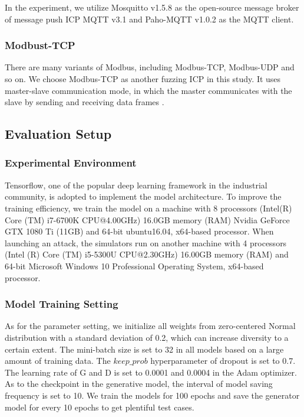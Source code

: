 In the experiment, we utilize Mosquitto v1.5.8 \cite{light2017mosquitto} as the open-source message broker of message push ICP MQTT v3.1 and  Paho-MQTT v1.0.2 \cite{light2017mosquitto} as the MQTT client. 

\subsubsection{Modbust-TCP}
There are many variants of Modbus, including Modbus-TCP, Modbus-UDP and so on. We choose Modbus-TCP as another fuzzing ICP in this study. It uses master-slave communication mode, in which the master communicates with the slave by sending and receiving data frames \cite{swales1999open}. 

\subsection{Evaluation Setup}
\subsubsection{Experimental Environment}
Tensorflow, one of the popular deep learning framework in the industrial community, is adopted to implement the model architecture. To improve the training efficiency, we train the model on a machine with 8 processors (Intel(R) Core (TM) i7-6700K CPU@4.00GHz)  16.0GB memory (RAM) Nvidia GeForce GTX 1080 Ti (11GB) and 64-bit ubuntu16.04, x64-based processor. When launching an attack, the simulators run on another machine with 4 processors (Intel (R) Core (TM) i5-5300U CPU@2.30GHz) 16.00GB memory (RAM) and 64-bit Microsoft Windows 10 Professional Operating System, x64-based processor.

\subsubsection{Model Training Setting}
As for the parameter setting, we initialize all weights from zero-centered Normal distribution with a standard deviation of 0.2, which can increase diversity to a certain extent. The mini-batch size is set to 32 in all models based on a large amount of training data. The $keep\_prob$ hyperparameter of dropout is set to 0.7. The learning rate of G and D is set to 0.0001 and 0.0004 in the Adam optimizer. As to the checkpoint in the generative model, the interval of model saving frequency is set to 10. We train the models for 100 epochs and save the generator model for every 10 epochs to get plentiful test cases.

